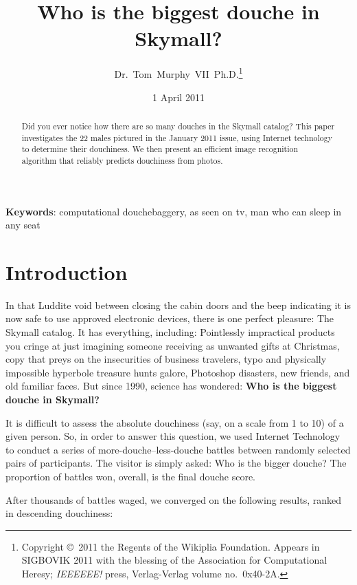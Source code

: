 \documentclass{article} %
\begin{document}
 

\title{Who is the biggest douche in Skymall?}
\author{Dr.~Tom~Murphy~VII~Ph.D.\thanks{
Copyright \copyright\ 2011 the Regents of the Wikiplia
Foundation. Appears in SIGBOVIK 2011 with the blessing of the
Association for Computational Heresy; {\em IEEEEEE!} press,
Verlag-Verlag volume no.~0x40-2A.
}
}

\date{1 April 2011}

\maketitle

\begin{abstract}
Did you ever notice how there are so many douches in the Skymall
catalog? This paper investigates the 22 males pictured in the January
2011 issue, using Internet technology to determine their douchiness.
We then present an efficient image recognition algorithm that reliably
predicts douchiness from photos.
\end{abstract}

\vspace{1em}
{\noindent \small {\bf Keywords}:
 computational douchebaggery, as seen on tv, man who can sleep in any seat
}

\section*{Introduction}
In that Luddite void between closing the cabin doors and the beep
indicating it is now safe to use approved electronic devices, there is
one perfect pleasure: The Skymall catalog. It has everything,
including: Pointlessly impractical products you cringe at just
imagining someone receiving as unwanted gifts at Christmas, copy that
preys on the insecurities of business travelers, typo and physically
impossible hyperbole treasure hunts galore, Photoshop disasters, new
friends, and old familiar faces. But since 1990, science has wondered:
{\bf Who is the biggest douche in Skymall?}

It is difficult to assess the absolute douchiness (say, on a scale
from 1 to 10) of a given person. So, in order to answer this question,
we used Internet Technology to conduct a series of
more-douche--less-douche battles between randomly selected pairs of
participants. The visitor is simply asked: Who is the bigger douche?
The proportion of battles won, overall, is the final douche score.

After thousands of battles waged, we converged on the following results,
ranked in descending douchiness:
\end{document}
